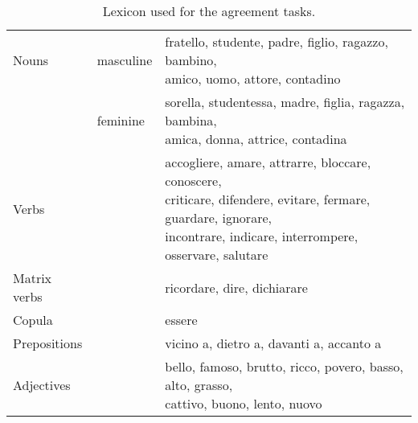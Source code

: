 \begin{table}[b]
    \centering
    \begin{tabular}{|lll|}
        \hline
    Nouns & masculine & \specialcell{fratello, studente, padre, figlio, ragazzo, bambino,\\ amico, uomo, attore, contadino} \\
    & feminine & \specialcell{sorella, studentessa, madre, figlia, ragazza, bambina,\\ amica, donna, attrice, contadina}\\
    \hline 
    Verbs & & \specialcell{accogliere, amare, attrarre, bloccare, conoscere,\\ criticare, difendere, evitare, fermare, guardare, ignorare,\\ incontrare, indicare, interrompere, osservare, salutare}\\
    Matrix verbs & & ricordare, dire, dichiarare \\
    Copula & & essere\\
    \hline
    Prepositions & & vicino a, dietro a, davanti a, accanto a\\
    \hline
    Adjectives & & \specialcell{bello, famoso, brutto, ricco, povero, basso, alto, grasso,\\ cattivo, buono, lento, nuovo}\\
    \hline
    \end{tabular}
    \caption{Lexicon used for the agreement tasks.}\label{table:lexicon}
\end{table}
